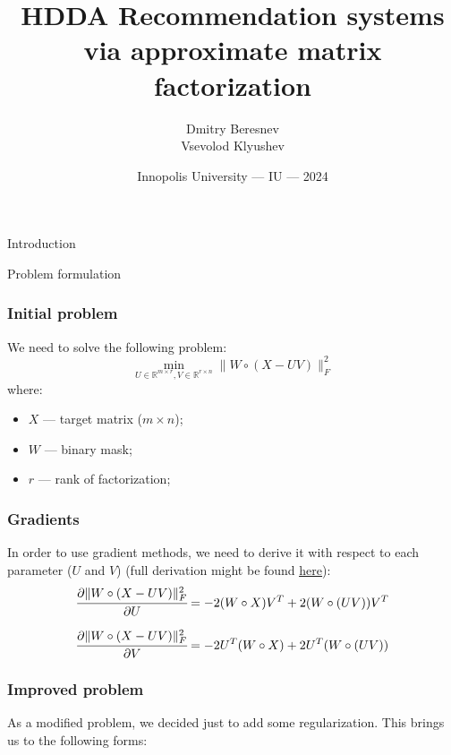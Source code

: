 \documentclass[pdf,10pt]{beamer}
\title[]{HDDA Recommendation systems
via approximate matrix factorization}
\date[2024]{Innopolis University --- IU --- 2024\\ \vspace{0.5cm}}
\author[Beresnev, Klyushev \hspace{0.2cm}]{\texorpdfstring{Dmitry Beresnev \\ Vsevolod Klyushev}{}}
\def\R{\mathbb{R}}
\begin{document}
\begin{frame}
  \titlepage
\end{frame}

\begin{section}{Introduction}

 \begin{subsection}{Problem formulation}

   \begin{frame}
     \frametitle{Initial problem}

     We need to solve the following problem:
     \begin{equation} \label{initial}
       \min_{U \in \R^{m\times r}, V \in \R^{r\times n}} \|W \circ (X - UV)\|^2_F
     \end{equation}
     where:
     \begin{itemize}
       \item $X$ --- target matrix ($m\times n$);
       \item $W$ --- binary mask;
       \item $r$ --- rank of factorization;
     \end{itemize}

   \end{frame}

   \begin{frame}
     \frametitle{Gradients}

     In order to use gradient methods, we need to derive it with respect to each parameter ($U$ and $V$) (full derivation might be found \href{https://hushtheblock.github.io/2020/08/06/Derivative-of-a-function/}{\underline{here}}):
     \begin{equation}
       \cfrac{\partial \|W \circ (X - UV)\|^2_F}{\partial U} = -2 (W \circ X) V^T + 2 (W \circ (UV)) V^T
     \end{equation}

     \begin{equation}
       \cfrac{\partial \|W \circ (X - UV)\|^2_F}{\partial V} = -2 U^T (W \circ X) + 2 U^T (W \circ (UV))
     \end{equation}


   \end{frame}

   \begin{frame}

     \frametitle{Improved problem}

     As a modified problem, we decided just to add some regularization. This brings us to the following forms:


\end{frame}
\end{subsection}
\end{section}
\end{document}
